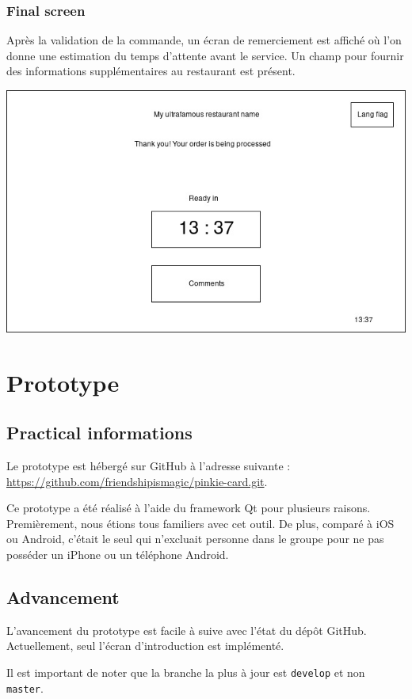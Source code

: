 \documentclass[a4paper,12pt]{article}
\begin{document}
\subsubsection{Final screen}

Après la validation de la commande, un écran de remerciement est affiché où l'on donne une estimation du temps
d'attente avant le service. Un champ pour fournir des informations supplémentaires au restaurant est présent.

\begin{center}
	\includegraphics[width=\textwidth]{final_screen.jpg}
\end{center}

\section{Prototype}

\subsection{Practical informations}

Le prototype est hébergé sur GitHub à l'adresse suivante : \\
\url{https://github.com/friendshipismagic/pinkie-card.git}.

Ce prototype a été réalisé à l'aide du framework Qt pour plusieurs raisons. Premièrement, nous étions tous familiers
avec cet outil. De plus, comparé à iOS ou Android, c'était le seul qui n'excluait personne dans le groupe pour ne pas
posséder un iPhone ou un téléphone Android.

\subsection{Advancement}

L'avancement du prototype est facile à suive avec l'état du dépôt GitHub. Actuellement, seul l'écran d'introduction
est implémenté.

Il est important de noter que la branche la plus à jour est \texttt{develop} et non \texttt{master}.
\end{document}

